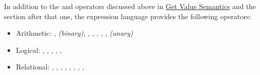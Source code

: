 \foreignlanguage{english}{In addition to the
}\foreignlanguage{english}{
and
}\foreignlanguage{english}{
operators discussed above in
}\href{http://developers.sun.com/docs/jscreator/help/jsp-jsfel/jsf_expression_language_intro.html#getvaluesemantics}{Get
Value Semantics}\foreignlanguage{english}{ and the section after that
one, the expression language provides the following operators: }

\liststyleWWNumxiv
\begin{itemize}
\item \foreignlanguage{english}{Arithmetic:
}\foreignlanguage{english}{,
}\foreignlanguage{english}{\textit{(binary)}}\foreignlanguage{english}{,
}\foreignlanguage{english}{,
}\foreignlanguage{english}{,
}\foreignlanguage{english}{,
}\foreignlanguage{english}{,
}\foreignlanguage{english}{,
}\foreignlanguage{english}{
}\foreignlanguage{english}{\textit{(unary)}}\foreignlanguage{english}{
\newline
}
\item Logical: ,
\textstyleHTMLTypewriter{\&\&}, ,
\textstyleHTMLTypewriter{{\textbar}{\textbar}},
, \textstyleHTMLTypewriter{!} \newline
\textstylespv{~}
\item \foreignlanguage{english}{Relational:
}\foreignlanguage{english}{,
}\foreignlanguage{english}{,
}\foreignlanguage{english}{,
}\foreignlanguage{english}{,
}\foreignlanguage{english}{,
}\foreignlanguage{english}{,
}\foreignlanguage{english}{,
}\foreignlanguage{english}{,
}
\end{itemize}
